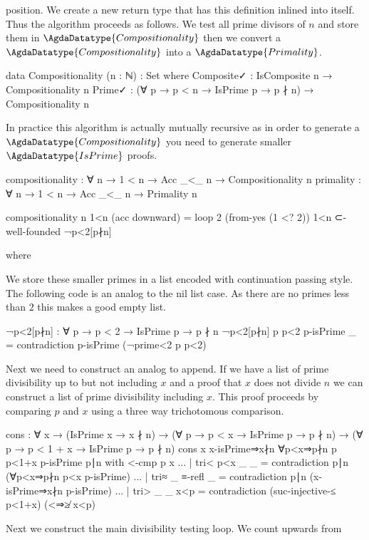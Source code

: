 \documentclass[./Thesis.tex]{subfiles}
\begin{document}
position. We create a new return type that has this definition inlined into
itself. Thus the algorithm proceeds as follows. We test all prime divisors of
$n$ and store them in $\AgdaDatatype{Compositionality}$ then we convert a
$\AgdaDatatype{Compositionality}$ into a $\AgdaDatatype{Primality}$.
\begin{code}
  data Compositionality (n : ℕ) : Set where
    Composite✓ : IsComposite n → Compositionality n
    Prime✓ : (∀ {p} → p < n → IsPrime p → p ∤ n) → Compositionality n
\end{code}
In practice this algorithm is actually mutually recursive as in order to generate
a $\AgdaDatatype{Compositionality}$ you need to generate smaller
$\AgdaDatatype{IsPrime}$ proofs.
\begin{code}
  compositionality : ∀ n → 1 < n → Acc _<_ n → Compositionality n
  primality : ∀ n → 1 < n → Acc _<_ n → Primality n
\end{code}
\begin{code}
  compositionality n 1<n (acc downward)
    = loop 2 (from-yes (1 <? 2)) 1<n ⊂-well-founded ¬p<2[p∤n]
\end{code}
\begin{code}[hide]
    where
\end{code}
We store these smaller primes in a list encoded with continuation passing style.
The following code is an analog to the nil list case. As there are no primes
less than $2$ this makes a good empty list.
\begin{code}
    ¬p<2[p∤n] : ∀ {p} → p < 2 → IsPrime p → p ∤ n
    ¬p<2[p∤n] {p} p<2 p-isPrime _ = contradiction p-isPrime (¬prime<2 p p<2)
\end{code}
Next we need to construct an analog to append. If we have a list of prime
divisibility up to but not including $x$ and a proof that $x$ does not
divide $n$ we can construct a list of prime divisibility including $x$. This
proof proceeds by comparing $p$ and $x$ using a three way trichotomous
comparison.
\begin{code}
    cons
      : ∀ {x}
      → (IsPrime x → x ∤ n)
      → (∀ {p} → p < x → IsPrime p → p ∤ n)
      → (∀ {p} → p < 1 + x → IsPrime p → p ∤ n)
    cons {x} x-isPrime⇒x∤n ∀p<x⇒p∤n {p} p<1+x p-isPrime p∣n with <-cmp p x
    ... | tri< p<x _ _ = contradiction p∣n (∀p<x⇒p∤n p<x p-isPrime)
    ... | tri≈ _ ≡-refl _ = contradiction p∣n (x-isPrime⇒x∤n p-isPrime)
    ... | tri> _ _ x<p = contradiction (suc-injective-≤ p<1+x) (<⇒≱ x<p)
\end{code}
Next we construct the main divisibility testing loop. We count upwards from
\end{document}
